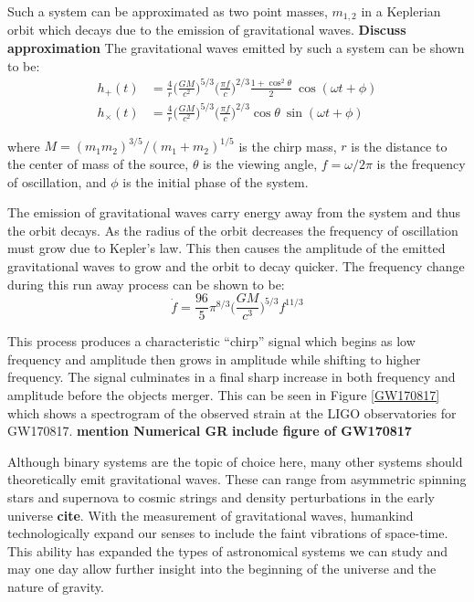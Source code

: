 \documentclass [12pt, proquest]{uwthesis}[2019]
\begin{document}
Such a system can be approximated as two point masses, $m_{1,2}$ in a Keplerian orbit which decays due to the emission of gravitational waves. \textbf{Discuss approximation} The gravitational waves emitted by such a system can be shown to be:
\begin{align}
h_+(t)&=\frac{4}{r}\bigg(\frac{GM}{c^2}\bigg)^{5/3} \bigg( \frac{\pi f}{c} \bigg)^{2/3} \frac{1+\cos^2\theta}{2} \ \cos(\omega t + \phi)\\
h_\times(t)&=\frac{4}{r}\bigg(\frac{GM}{c^2}\bigg)^{5/3} \bigg( \frac{\pi f}{c} \bigg)^{2/3} \cos\theta\ \sin(\omega t + \phi)
\end{align}

where $M=(m_1 m_2)^{3/5}/(m_1+m_2)^{1/5}$ is the chirp mass, $r$ is the distance to the center of mass of the source, $\theta$ is the viewing angle, $f=\omega/2\pi$ is the frequency of oscillation, and $\phi$ is the initial phase of the system.

The emission of gravitational waves carry energy away from the system and thus the orbit decays. As the radius of the orbit decreases the frequency of oscillation must grow due to Kepler's law. This then causes the amplitude of the emitted gravitational waves to grow and the orbit to decay quicker. The frequency change during this run away process can be shown to be:
\begin{equation}
\dot{f}=\frac{96}{5}\pi^{8/3}\bigg(\frac{G M}{c^3}\bigg)^{5/3} f^{11/3}
\end{equation}

This process produces a characteristic ``chirp'' signal which begins as low frequency and amplitude then grows in amplitude while shifting to higher frequency. The signal culminates in a final sharp increase in both frequency and amplitude before the objects merger. This can be seen in Figure \ref{GW170817} which shows a spectrogram of the observed strain at the LIGO observatories for GW170817.
 \textbf{mention Numerical GR}
 \textbf{include figure of GW170817}
 
 Although binary systems are the topic of choice here, many other systems should theoretically emit gravitational waves. These can range from asymmetric spinning stars and supernova to cosmic strings and density perturbations in the early universe \textbf{cite}. With the measurement of gravitational waves, humankind technologically expand our senses to include the faint vibrations of space-time. This ability has expanded the types of astronomical systems we can study and may one day allow further insight into the beginning of the universe and the nature of gravity.
\end{document}
